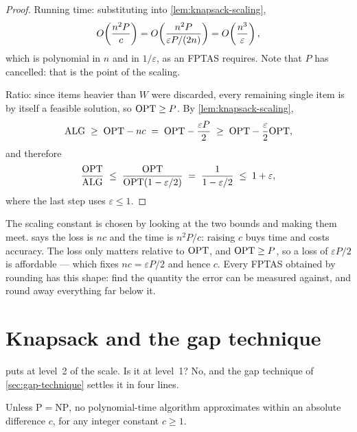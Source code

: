 \begin{proof}
Running time: substituting into \cref{lem:knapsack-scaling},
\[ O\!\left(\frac{n^2 P}{c}\right) = O\!\left(\frac{n^2P}{\varepsilon P/(2n)}\right)
   = O\!\left(\frac{n^3}{\varepsilon}\right), \]
which is polynomial in $n$ and in $1/\varepsilon$, as an FPTAS requires. Note
that $P$ has cancelled: that is the point of the scaling.

Ratio: since items heavier than $W$ were discarded, every remaining single item
is by itself a feasible solution, so $\mathrm{OPT} \ge P$. By
\cref{lem:knapsack-scaling},
\[ \mathrm{ALG} \;\ge\; \mathrm{OPT} - nc \;=\; \mathrm{OPT} - \frac{\varepsilon P}{2}
   \;\ge\; \mathrm{OPT} - \frac{\varepsilon}{2}\mathrm{OPT}, \]
and therefore
\[ \frac{\mathrm{OPT}}{\mathrm{ALG}} \;\le\; \frac{\mathrm{OPT}}{\mathrm{OPT}(1 - \varepsilon/2)}
   \;=\; \frac{1}{1-\varepsilon/2} \;\le\; 1 + \varepsilon, \]
where the last step uses $\varepsilon \le 1$.
\end{proof}

\begin{intuition}
The scaling constant is chosen by looking at the two bounds and making them
meet.  says the loss is $nc$ and the time is
$n^2P/c$: raising $c$ buys time and costs accuracy. The loss only matters
relative to $\mathrm{OPT}$, and $\mathrm{OPT} \ge P$, so a loss of $\varepsilon P/2$ is
affordable --- which fixes $nc = \varepsilon P/2$ and hence $c$. Every FPTAS
obtained by rounding has this shape: find the quantity the error can be
measured against, and round away everything far below it.
\end{intuition}

\section{Knapsack and the gap technique}
\label{sec:knapsack-gap}

 puts  at level~2 of the scale. Is it at
level~1? No, and the gap technique of \cref{sec:gap-technique} settles it in
four lines.

\begin{theorem}\label{thm:knapsack-no-additive}
Unless $\mathrm{P} = \mathrm{NP}$, no polynomial-time algorithm approximates
 within an absolute difference $c$, for any integer constant
$c \ge 1$.
\end{theorem}

